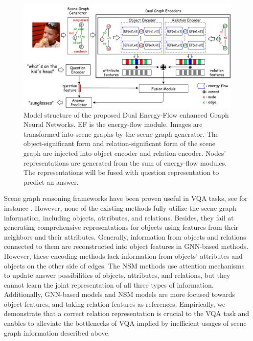 \documentclass[letterpaper]{article} %
\begin{document}
\begin{figure}[ht] 
    \vspace{-0.5in}
    \centering 
    \includegraphics[width=1.0\textwidth]{./pic/DE-GNN.pdf} 
    \caption{Model structure of the proposed Dual Energy-Flow enhanced Graph Neural Networks. EF is the energy-flow module. Images are transformed into scene graphs by the scene graph generator. The object-significant form and relation-significant form of the scene graph are injected into object encoder and relation encoder. Nodes' representations are generated from the sum of energy-flow modules. The representations will be fused with question representation to predict an answer.} 
    \label{fig2} 
\end{figure}


Scene graph reasoning frameworks have been proven useful in VQA tasks, see for instance \cite{johnson2015image,DBLP:journals/corr/abs-2007-01072,yang2020prior}. 
However, none of the existing methods fully utilize the scene graph information, including objects, attributes, and relations.
Besides, they fail at generating comprehensive representations for objects using features from their neighbors and their attributes. 
Generally, information from objects and relations connected to them are reconstructed into object features in GNN-based methods.
However, these encoding methods lack information from objects' attributes and objects on the other side of edges. 
The NSM methods use attention mechanisms to update answer possibilities of objects, attributes, and relations, but they cannot learn the joint representation of all three types of information. 
Additionally, GNN-based models and NSM models are more focused towards object features, and taking relation features as references. 
Empirically, we demonstrate that a correct relation representation is crucial to the VQA task and enables to alleviate the bottlenecks of VQA implied by inefficient usages of scene graph information described above.
\end{document}
